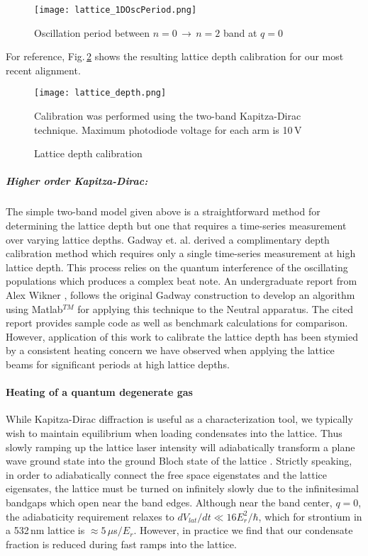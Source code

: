 	\begin{figure}
		\centerline{
		\texttt{[image: lattice\_1DOscPeriod.png]}}
		\caption{Oscillation period between $n=0\,\rightarrow\,n=2$ band at $q=0$}
		\label{fig:latOscPeriod}
	\end{figure} 
For reference, Fig.\,\ref{fig:latDepth} shows the resulting lattice depth calibration for our most recent alignment.
	\begin{figure} 
		\centerline{
		\texttt{[image: lattice\_depth.png]}}
		\caption{Lattice depth calibration}{Calibration was performed using the two-band Kapitza-Dirac technique. Maximum photodiode voltage for each arm is 10\,V}
		\label{fig:latDepth}
	\end{figure}
	
\subparagraph{Higher order Kapitza-Dirac:}
The simple two-band model given above is a straightforward method for determining the lattice depth but one that requires a time-series measurement over varying lattice depths.
Gadway et. al. \cite{Gadway2009} derived a complimentary depth calibration method which requires only a single time-series measurement at high lattice depth.
This process relies on the quantum interference of the oscillating populations which produces a complex beat note.
An undergraduate report from Alex Wikner \cite{Wikner2017}, follows the original Gadway construction to develop an algorithm using Matlab$^{TM}$ for applying this technique to the Neutral apparatus.
The cited report provides sample code as well as benchmark calculations for comparison.
However, application of this work to calibrate the lattice depth has been stymied by a consistent heating concern we have observed when applying the lattice beams for significant periods at high lattice depths.

\paragraph{Heating of a quantum degenerate gas}
While Kapitza-Dirac diffraction is useful as a characterization tool, we typically wish to maintain equilibrium when loading condensates into the lattice. 
Thus slowly ramping up the lattice laser intensity will adiabatically transform a plane wave ground state into the ground Bloch state of the lattice \cite{Sakurai2010}. 
Strictly speaking, in order to adiabatically connect the free space eigenstates and the lattice eigensates, the lattice must be turned on infinitely slowly due to the infinitesimal bandgaps which open near the band edges. 
Although near the band center, $q=0$, the adiabaticity requirement relaxes to $dV_{lat}/dt \ll 16E_r^2/ \hbar$, \cite{Denschlag2002} which for strontium in a 532\,nm lattice is $\approx 5\,\mu$s$/E_r$. However, in practice we find that our condensate fraction is reduced during fast ramps into the lattice. 

